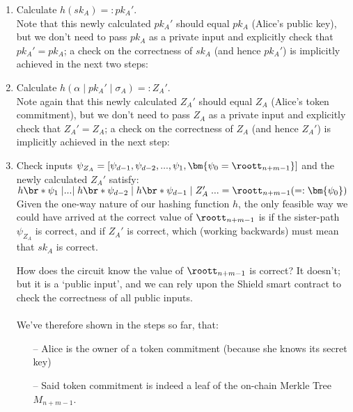 \begin{enumerate}
  \item Calculate $h(sk_A) =: pk_A'$.\\
    Note that this newly calculated $pk_A'$ should equal $pk_A$ (Alice's public key), but we don't need to pass $pk_A$ as a private input and explicitly check that $pk_A'=pk_A$; a check on the correctness of $sk_A$ (and hence $pk_A'$) is implicitly achieved in the next two steps:
  \item Calculate $h(\alpha\;|\;pk_A'\;|\;\sigma_A) =: Z_A'$.\\
    Note again that this newly calculated $Z_A'$ should equal $Z_A$ (Alice's token commitment), but we don't need to pass $Z_A$ as a private input and explicitly check that $Z_A'=Z_A$; a check on the correctness of $Z_A$ (and hence $Z_A'$) is implicitly achieved in the next step:
  \item Check inputs $\psi_{Z_A}=[\psi_{d-1}, \psi_{d-2},..., \psi_{1}, \bm{\psi_{0}=\roott_{n+m-1}}]$ and the newly calculated $Z_A'$ satisfy:\\
    $h\br*{\psi_{1}\;|...|\;h\br*{\psi_{d-2}\;|\;h\br*{\psi_{d-1}\;|\;Z_A'}\;}...} = \roott_{n+m-1} ( =: \bm{\psi_{0}})$\\
    Given the one-way nature of our hashing function $h$, the only feasible way we could have arrived at the correct value of $\roott_{n+m-1}$ is if the sister-path $\psi_{Z_A}$ is correct, and if $Z_A'$ is correct, which (working backwards) must mean that $sk_A$ is correct.

    How does the circuit know the value of $\roott_{n+m-1}$ is correct? It doesn't; but it is a `public input', and we can rely upon the Shield smart contract to check the correctness of all public inputs.\\
  \\
  We've therefore shown in the steps so far, that:
  \begin{itemize}
    \item[--] Alice is the owner of a token commitment (because she knows its secret key)
    \item[--] Said token commitment is indeed a leaf of the on-chain Merkle Tree $M_{n+m-1}$.
  \end{itemize}


\end{enumerate}
